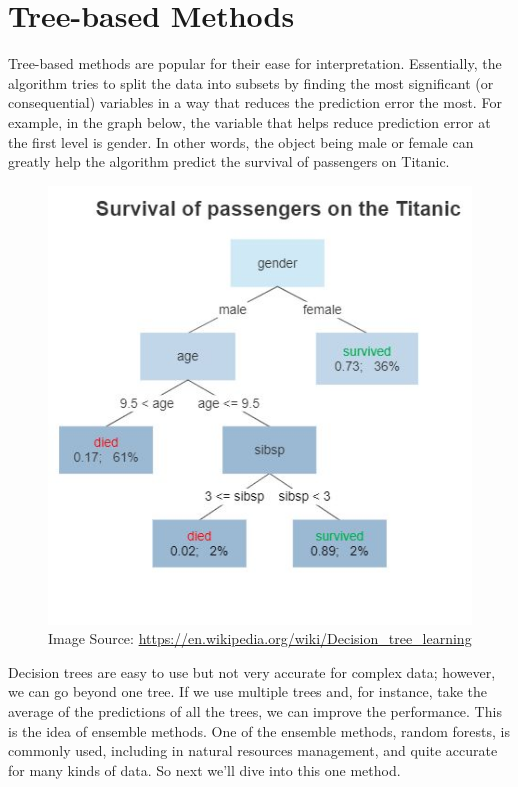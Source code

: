 \documentclass[
]{book}
\begin{document}
\hypertarget{tree-based-methods}{%
\section{Tree-based Methods}\label{tree-based-methods}}

Tree-based methods are popular for their ease for interpretation. Essentially, the algorithm tries to split the data into subsets by finding the most significant (or consequential) variables in a way that reduces the prediction error the most. For example, in the graph below, the variable that helps reduce prediction error at the first level is gender. In other words, the object being male or female can greatly help the algorithm predict the survival of passengers on Titanic.

\begin{figure}
\centering
\includegraphics{images/Decision_Tree.jpg}
\caption{Image Source: \url{https://en.wikipedia.org/wiki/Decision_tree_learning}}
\end{figure}

Decision trees are easy to use but not very accurate for complex data; however, we can go beyond one tree. If we use multiple trees and, for instance, take the average of the predictions of all the trees, we can improve the performance. This is the idea of ensemble methods. One of the ensemble methods, random forests, is commonly used, including in natural resources management, and quite accurate for many kinds of data. So next we'll dive into this one method.
\end{document}

